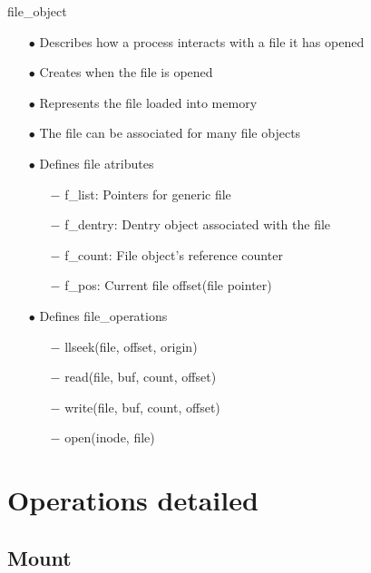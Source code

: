 \documentclass{beamer}
\begin{document}
\begin{frame}{file\_object}
	\begin{itemize}[<+->]
		\item[$\bullet$]{Describes how a process interacts with a file it has opened}
		\item[$\bullet$]{Creates when the file is opened}
		\item[$\bullet$]{Represents the file loaded into memory}
		\item[$\bullet$]{The file can be associated for many file objects}

		\item[$\bullet$]{Defines file atributes}
			\begin{itemize}
				\item[$-$]{f\_list: Pointers for generic file}
				\item[$-$]{f\_dentry: Dentry object associated with the file}
				\item[$-$]{f\_count: File object's reference counter}
				\item[$-$]{f\_pos: Current file offset(file pointer)}
			\end{itemize}
		\item[$\bullet$]{Defines file\_operations}
			\begin{itemize}
				\item[$-$]{llseek(file, offset, origin)}
				\item[$-$]{read(file, buf, count, offset)}
				\item[$-$]{write(file, buf, count, offset)}
				\item[$-$]{open(inode, file)}
			\end{itemize}
	\end{itemize}
\end{frame}

\section{Operations detailed}

\subsection{Mount}
\end{document}
